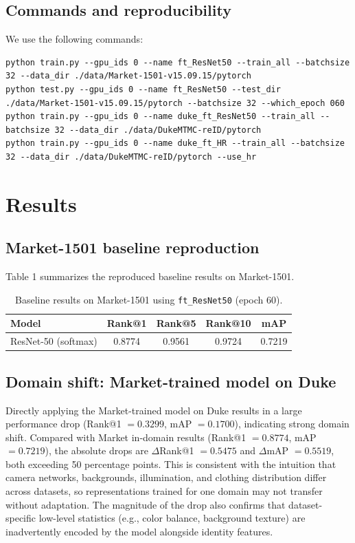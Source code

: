 \documentclass[sigconf,nonacm]{acmart}
\begin{document}
\subsection{Commands and reproducibility}
We use the following commands:
\begin{lstlisting}
python train.py --gpu_ids 0 --name ft_ResNet50 --train_all --batchsize 32 --data_dir ./data/Market-1501-v15.09.15/pytorch
python test.py --gpu_ids 0 --name ft_ResNet50 --test_dir ./data/Market-1501-v15.09.15/pytorch --batchsize 32 --which_epoch 060
python train.py --gpu_ids 0 --name duke_ft_ResNet50 --train_all --batchsize 32 --data_dir ./data/DukeMTMC-reID/pytorch
python train.py --gpu_ids 0 --name duke_ft_HR --train_all --batchsize 32 --data_dir ./data/DukeMTMC-reID/pytorch --use_hr
\end{lstlisting}

\section{Results}
\subsection{Market-1501 baseline reproduction}
Table 1 summarizes the reproduced baseline results on Market-1501.

\begin{table}[t]
\centering
\small
\begin{tabular}{lcccc}
\toprule
Model & Rank@1 & Rank@5 & Rank@10 & mAP \\
\midrule
ResNet-50 (softmax) & 0.8774 & 0.9561 & 0.9724 & 0.7219 \\
\bottomrule
\end{tabular}
\caption{Baseline results on Market-1501 using \texttt{ft\_ResNet50} (epoch 60).}
\label{tab:market}
\end{table}

\subsection{Domain shift: Market-trained model on Duke}
Directly applying the Market-trained model on Duke results in a large performance drop (Rank@1 $=0.3299$, mAP $=0.1700$), indicating strong domain shift.
Compared with Market in-domain results (Rank@1 $=0.8774$, mAP $=0.7219$), the absolute drops are $\Delta$Rank@1 $=0.5475$ and $\Delta$mAP $=0.5519$, both exceeding 50 percentage points.
This is consistent with the intuition that camera networks, backgrounds, illumination, and clothing distribution differ across datasets, so representations trained for one domain may not transfer without adaptation.
The magnitude of the drop also confirms that dataset-specific low-level statistics (e.g., color balance, background texture) are inadvertently encoded by the model alongside identity features.
\end{document}
